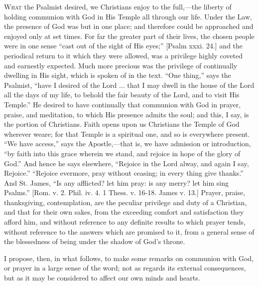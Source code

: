 W\textsc{hat} the Psalmist desired, we Christians enjoy to the full,—the
liberty of holding communion with God in His Temple all through our
life. Under the Law, the presence of God was but in one place; and
therefore could be approached and enjoyed only at set times. For far
the greater part of their lives, the chosen people were in one sense
``cast out of the sight of His eyes;'' [Psalm xxxi. 24.] and
the periodical return to it which they were allowed, was a privilege
highly coveted and earnestly expected. Much more precious was the
privilege of continually dwelling in His sight, which is spoken of in
the text. ``One thing,'' says the Psalmist, ``have I
desired of the Lord ... that I may dwell in the house of the Lord all
the days of my life, to behold the fair beauty of the Lord, and to
visit His Temple.'' He desired to have continually that communion
with God in prayer, praise, and meditation, to which His presence
admits the soul; and this, I say, is the portion of Christians. Faith
opens upon us Christians the Temple of God wherever we\emph{}are; for
that Temple is a spiritual one, and so is everywhere present. ``We
have access,'' says the Apostle,—that is, we have admission or
introduction, ``by faith into this grace wherein we stand, and
rejoice in hope of the glory of God.'' And hence he says
elsewhere, ``Rejoice in the Lord alway, and again I say,
Rejoice.'' ``Rejoice evermore, pray without ceasing; in every
thing give thanks.'' And St. James, ``Is any afflicted? let
him pray: is any merry? let him sing Psalms.'' [Rom. v. 2. Phil.
iv. 4. 1 Thess. v. 16-18. James v. 13.] Prayer, praise, thanksgiving,
contemplation, are the peculiar privilege and duty of a Christian, and
that for their own sakes, from the exceeding comfort and satisfaction
they afford him, and without reference to any definite results to
which prayer tends, without reference to the answers which are
promised to it, from a general sense of the blessedness of being under
the shadow of God's throne.

I propose, then, in what follows, to make some remarks on communion
with God, or prayer in a large sense of the word; not as regards its
external consequences, but as it may be considered to affect our own
minds and hearts.

